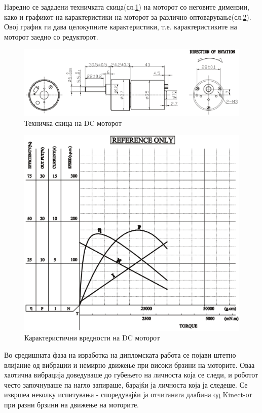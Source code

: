 \documentclass[11pt]{article}
\begin{document}
		  Наредно се зададени техничката скица(сл.\ref{fig:motor_schematic}) на моторот со неговите димензии, како и графикот на карактеристики на моторот за различно оптоварување(сл.\ref{fig:motor_graph}). Овој график ги дава целокупните карактеристики, т.е. карактеристиките на моторот заедно со редукторот.

      \begin{figure}[H]
        \includegraphics[width=0.75\linewidth]{./images/motor_schematic.png}
		    \centering
        \caption{Техничка скица на DC моторот}
		    \label{fig:motor_schematic}
		    \end{figure}

	    \begin{figure}[H]
		    \includegraphics[width=0.75\linewidth]{./images/motor_graph.png}
		    \centering
		    \caption{Карактеристични вредности на DC моторот}
		    \label{fig:motor_graph}
	      \end{figure}


      Во средишната фаза на изработка на дипломската работа се појави штетно влијание од вибрации и немирно движење при високи брзини на моторите. Оваа хаотична вибрација доведуваше до губењето на личноста која се следи, и роботот често започнуваше па нагло запираше, барајќи ја личноста која ја следеше. Се извршеа неколку испитувања - споредувајќи ја отчитаната длабина од Kinect-от при разни брзини на движење на моторите.
\end{document}
